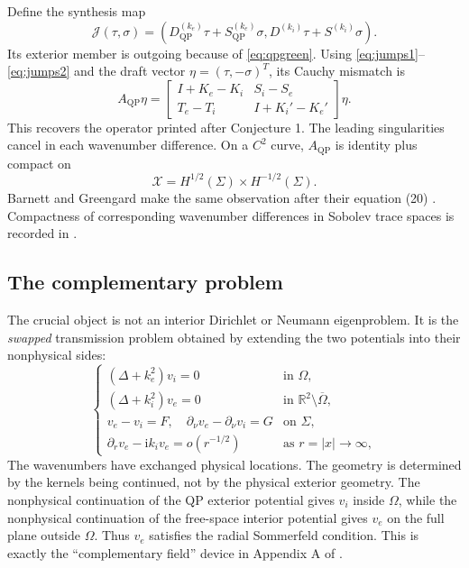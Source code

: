 \documentclass[11pt]{article}
\newcommand{\Om}{\Omega}
\newcommand{\Sig}{\Sigma}
\newcommand{\R}{\mathbb R}
\newcommand{\ii}{\mathrm i}
\newcommand{\QP}{\mathrm{QP}}
\theoremstyle{plain}
\theoremstyle{definition}
\theoremstyle{remark}
\begin{document}
Define the synthesis map
\begin{equation}
\mathcal J(\tau,\sigma)=
\left(
D_{\QP}^{(k_e)}\tau+S_{\QP}^{(k_e)}\sigma,
D^{(k_i)}\tau+S^{(k_i)}\sigma
\right).
\label{eq:J}
\end{equation}
Its exterior member is outgoing because of \eqref{eq:qpgreen}.  Using
\eqref{eq:jumps1}--\eqref{eq:jumps2} and the draft vector
\(\eta=(\tau,-\sigma)^T\), its Cauchy mismatch is
\begin{equation}
A_{\QP}\eta=
\begin{bmatrix}
I+K_e-K_i&S_i-S_e\\
T_e-T_i&I+K_i'-K_e'
\end{bmatrix}\eta.
\label{eq:A}
\end{equation}
This recovers the operator printed after Conjecture 1.  The leading
singularities cancel in each wavenumber difference.  On a \(C^2\) curve,
\(A_{\QP}\) is identity plus compact on
\begin{equation}
\mathcal X=H^{1/2}(\Sig)\times H^{-1/2}(\Sig).
\label{eq:X}
\end{equation}
Barnett and Greengard make the same observation after their equation (20)
\cite[Section 3]{BarnettGreengard2010}.  Compactness of corresponding
wavenumber differences in Sobolev trace spaces is recorded in
\cite[Section 4.1]{DominguezLyonTurc2016}.

\subsection{The complementary problem}

The crucial object is not an interior Dirichlet or Neumann eigenproblem.  It is
the \emph{swapped} transmission problem obtained by extending the two
potentials into their nonphysical sides:
\begin{equation}
\begin{cases}
(\Delta+k_e^2)v_i=0&\text{in }\Om,\\
(\Delta+k_i^2)v_e=0&\text{in }\R^2\setminus\overline\Om,\\
v_e-v_i=F,\quad
\partial_\nu v_e-\partial_\nu v_i=G&\text{on }\Sig,\\
\displaystyle
\partial_r v_e-\ii k_i v_e=o(r^{-1/2})
&\text{as }r=|x|\to\infty,
\end{cases}
\label{eq:complement}
\end{equation}
The wavenumbers have exchanged physical locations.  The geometry is determined
by the kernels being continued, not by the physical exterior geometry.  The
nonphysical continuation of the QP exterior potential gives \(v_i\) inside
\(\Om\), while the nonphysical continuation of the free-space interior
potential gives \(v_e\) on the full plane outside \(\Om\).  Thus \(v_e\)
satisfies the radial Sommerfeld condition.  This is exactly the
``complementary field'' device in Appendix A of
\cite{BarnettGreengard2010}.
\end{document}
